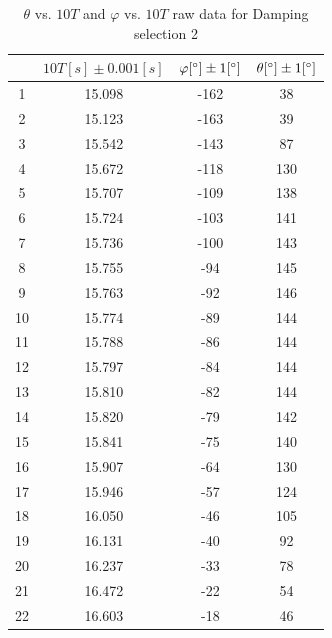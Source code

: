 \begin{table}[H]
\centering
\begin{tabular}{|c|c|c|c|}
\hline
& $10T [s] \pm 0.001 [s]$ &  $\varphi  [^\circ]  \pm 1 [^\circ]$ & $ \theta [^\circ] \pm 1 [^\circ]$ \\ \hline

1  & 15.098 & -162  &  38   \\ \hline
2  & 15.123 & -163  &  39   \\ \hline
3  & 15.542 & -143  &  87   \\ \hline
4  & 15.672 & -118  &  130  \\ \hline
5  & 15.707 & -109  &  138  \\ \hline
6  & 15.724 & -103  &  141  \\ \hline
7  & 15.736 & -100  &  143  \\ \hline
8  & 15.755 & -94   &  145  \\ \hline
9  & 15.763 & -92   &  146  \\ \hline
10 & 15.774 & -89   &  144  \\ \hline
11 & 15.788 & -86   &  144  \\ \hline
12 & 15.797 & -84   &  144  \\ \hline
13 & 15.810 & -82   &  144  \\ \hline
14 & 15.820 & -79   &  142  \\ \hline
15 & 15.841 & -75   &  140  \\ \hline
16 & 15.907 & -64   &  130  \\ \hline
17 & 15.946 & -57   &  124  \\ \hline
18 & 16.050 & -46   &  105  \\ \hline
19 & 16.131 & -40   &  92   \\ \hline
20 & 16.237 & -33   &  78   \\ \hline
21 & 16.472 & -22   &  54   \\ \hline
22 & 16.603 & -18   &  46   \\ \hline
\end{tabular}    
\caption{$\theta$ vs. $10T$ and $\varphi$ vs. $10T$ raw data for Damping selection 2}
\end{table}

